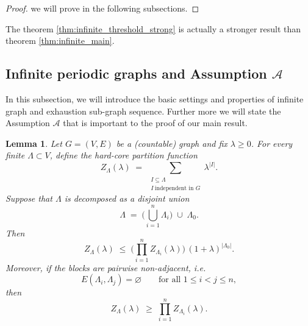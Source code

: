 \documentclass[a4paper,11pt]{article}
\theoremstyle{plain}
\newtheorem{lemma}[theorem]{Lemma}
\theoremstyle{definition}
\theoremstyle{remark}
\newcommand{\1}{\mathbf{1}}
\begin{document}
\begin{proof}
    we will prove in the following subsections.
\end{proof}

The theorem \ref{thm:infinite_threshold_strong} is actually a stronger result than theorem \ref{thm:infinite_main}.

\subsection{Infinite periodic graphs and Assumption $\mathcal{A}$}

In this subsection, we will introduce the basic settings and properties of infinite graph and  exhaustion sub-graph sequence. Further more we will state the Assumption $\mathcal{A}$ that is important to the proof of our main result.
\begin{lemma}
Let $G=(V,E)$ be a (countable) graph and fix $\lambda\ge 0$.
For every finite $\Lambda\subset V$, define the hard-core partition function
\[
Z_\Lambda(\lambda)\;=\;\sum_{\substack{I\subseteq \Lambda\\ I\ \text{independent in }G}}
\lambda^{|I|}.
\]
Suppose that $\Lambda$ is decomposed as a disjoint union
\[
\Lambda \;=\; \Big(\bigcup_{i=1}^n \Lambda_i\Big)\;\cup\;\Lambda_0 .
\]
Then
\[
Z_\Lambda(\lambda)\;\le\;\Big(\prod_{i=1}^n Z_{\Lambda_i}(\lambda)\Big)\,(1+\lambda)^{|\Lambda_0|}.
\]
Moreover, if the blocks are pairwise non-adjacent, i.e.
\[
E(\Lambda_i,\Lambda_j)=\varnothing \qquad \text{for all } 1\le i<j\le n,
\]
then
\[
Z_\Lambda(\lambda)\;\ge\;\prod_{i=1}^n Z_{\Lambda_i}(\lambda).
\]
\end{lemma}
\end{document}
